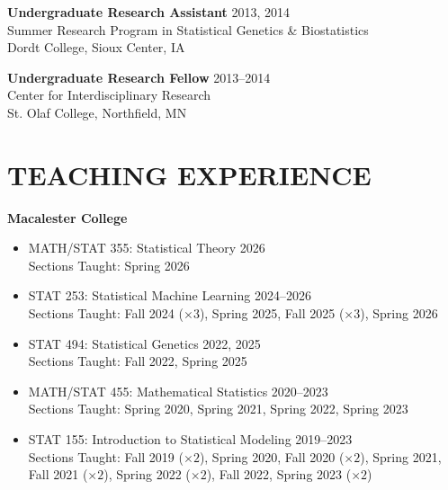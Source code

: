 \documentclass[margin]{res}
\begin{document}
\begin{resume}

\textbf{Undergraduate Research Assistant} \hfill 2013, 2014 \\
Summer Research Program in Statistical Genetics \& Biostatistics \\
Dordt College, Sioux Center, IA

\textbf{Undergraduate Research Fellow} \hfill 2013--2014 \\
Center for Interdisciplinary Research \\
St. Olaf College, Northfield, MN \\


\section{TEACHING EXPERIENCE}

\textbf{Macalester College}
\begin{itemize} 
\item MATH/STAT 355: Statistical Theory \hfill 2026 \\
Sections Taught: Spring 2026
\item STAT 253: Statistical Machine Learning \hfill 2024--2026 \\
Sections Taught: Fall 2024 ($\times 3$), Spring 2025, Fall 2025 ($\times 3$), Spring 2026 
\item STAT 494: Statistical Genetics \hfill 2022, 2025 \\
Sections Taught: Fall 2022, Spring 2025
\item MATH/STAT 455: Mathematical Statistics  \hfill 2020--2023 \\ 
Sections Taught: Spring 2020, Spring 2021, Spring 2022, Spring 2023
\item STAT 155: Introduction to Statistical Modeling  \hfill 2019--2023 \\
Sections Taught: Fall 2019 ($\times 2$), Spring 2020, Fall 2020 ($\times 2$), Spring 2021,\\ 
Fall 2021 ($\times 2$), Spring 2022 ($\times 2$), Fall 2022, Spring 2023 ($\times 2$)
\end{itemize}


\end{resume}
\end{document}

